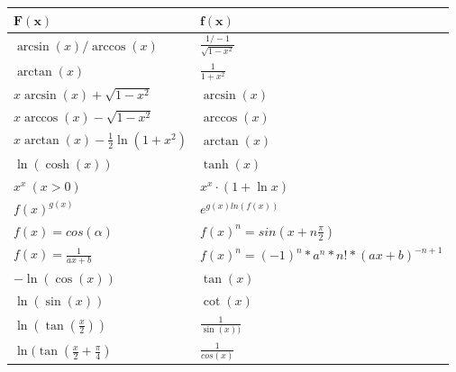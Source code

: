 \documentclass[8pt]{extarticle}
\begin{document}
\begin{multicols*}{3}
\begin{center}
\begin{tabularx}{\linewidth}{c>{\centering\arraybackslash}Xc}
  \end{tabularx}
\end{center}

\begin{center}
  \begin{tabularx}{\linewidth}{>{\centering\arraybackslash}X>{\centering\arraybackslash}X}
  
  $\mathbf{F(x)}$ & $\mathbf{f(x)}$ \\
  \midrule
  $\arcsin(x) / \arccos(x)$ & $\frac{1 / -1}{\sqrt{1 - x^2}}$ \\
  $\arctan(x)$ & $\frac{1}{1 + x^2}$ \\ 

  $x\arcsin(x) + \sqrt{1 - x^2}$ & $\arcsin(x)$\\
  $x\arccos(x) - \sqrt{1 - x^2}$ & $\arccos(x)$\\
  $x\arctan(x) - \frac{1}{2}\ln(1+x^2)$ & $\arctan(x)$\\
  $\ln(\cosh(x))$ & $\tanh(x)$\\

   
  $x^x \ (x > 0)$ & $x^x \cdot (1 + \ln{x})$ \\
$f(x)^{g(x)}$ & $e^{g(x) ln(f(x))}$\\
$f(x) = cos(\alpha)$ & $f(x)^n = sin(x + n\frac{\pi}{2})$\\
$f(x) = \frac{1}{ax + b}$ & $f(x)^n = (-1)^n * a^n * n! * (ax + b)^{-n+1}$\\
  $-\ln(\cos(x))$ & $\tan(x)$\\
  $\ln(\sin(x))$ & $\cot(x)$\\
  $\ln(\tan(\frac{x}{2}))$ & $\frac{1}{\sin(x))}$\\
  $\ln{(\tan(\frac{x}{2} + \frac{\pi}{4})}$ & $\frac{1}{cos(x)}$\\

  \bottomrule
  \end{tabularx}
\end{center}


\begin{center}
 \begin{tabularx}{\linewidth}{>{\centering\arraybackslash}X>{\centering\arraybackslash}X}
  

\end{tabularx}
\end{center}
\end{multicols*}
\end{document}
